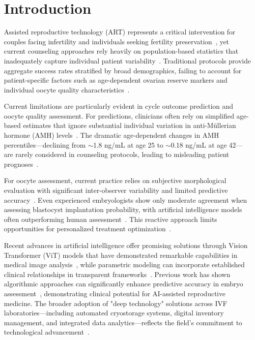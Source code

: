 \section{Introduction}\label{sec:introduction}

Assisted reproductive technology (ART) represents a critical intervention for couples facing infertility and individuals seeking fertility preservation~\cite{hfea2024statistics,sart2024national}, yet current counseling approaches rely heavily on population-based statistics that inadequately capture individual patient variability~\cite{gameiro2023understanding}. Traditional protocols provide aggregate success rates stratified by broad demographics, failing to account for patient-specific factors such as age-dependent ovarian reserve markers and individual oocyte quality characteristics~\cite{asrm2017embryo}.

Current limitations are particularly evident in cycle outcome prediction and oocyte quality assessment. For predictions, clinicians often rely on simplified age-based estimates that ignore substantial individual variation in anti-Müllerian hormone (AMH) levels~\cite{seifer2002amh,ovarian_reserve_testing}. The dramatic age-dependent changes in AMH percentiles—declining from $\sim$1.8 ng/mL at age 25 to $\sim$0.18 ng/mL at age 42—are rarely considered in counseling protocols, leading to misleading patient prognoses~\cite{lee2017amh,song2021amh}.

For oocyte assessment, current practice relies on subjective morphological evaluation with significant inter-observer variability and limited predictive accuracy~\cite{paternot2009observer,paternot2011multicentre,fordham2022embryologist}. Even experienced embryologists show only moderate agreement when assessing blastocyst implantation probability, with artificial intelligence models often outperforming human assessment~\cite{fordham2022embryologist}. This reactive approach limits opportunities for personalized treatment optimization~\cite{racowsky2010standardization}.

Recent advances in artificial intelligence offer promising solutions through Vision Transformer (ViT) models that have demonstrated remarkable capabilities in medical image analysis~\cite{dosovitskiy2021image,alhammuri2023vision}, while parametric modeling can incorporate established clinical relationships in transparent frameworks~\cite{rudin2019stop}. Previous work has shown algorithmic approaches can significantly enhance predictive accuracy in embryo assessment~\cite{rave2024bonna,silver2020datadriven}, demonstrating clinical potential for AI-assisted reproductive medicine. The broader adoption of "deep technology" solutions across IVF laboratories—including automated cryostorage systems, digital inventory management, and integrated data analytics—reflects the field's commitment to technological advancement~\cite{go2023deep}.

